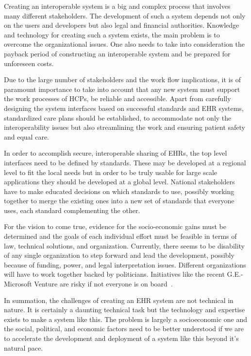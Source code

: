 \documentclass[14pt]{article}
\begin{document}
Creating an interoperable system is a big and complex process that involves many different stakeholders. The development of such a system depends not only on the users and developers but also legal and financial authorities. Knowledge and technology for creating such a system exists, the main problem is to overcome the organizational issues. One also needs to take into consideration the payback period of constructing an interoperable system and be prepared for unforeseen costs.

Due to the large number of stakeholders and the work flow implications, it is of paramount importance to take into account that any new system must support the work processes of \glspl{HCP}, be reliable and accessible. Apart from carefully designing the system interfaces based on successful standards and \gls{EHR} systems, standardized care plans should be established, to accommodate not only the interoperability issues but also streamlining the work and ensuring patient safety and equal care.


In order to accomplish secure, interoperable sharing of \glspl{EHR}, the \glspl{top level interface} need to be defined by standards. These may be developed at a regional level to fit the local needs but in order to be truly usable for large scale applications they should be developed at a global level. National stakeholders have to make educated decisions on which standards to use, possibly working together to merge the existing ones into a new set of standards that everyone uses, each standard complementing the other.

For the vision to come true, evidence for the socio-economic gains must be determined and the goals of each individual effort must be feasible in terms of law, technical solutions, and organization. Currently, there seems to be disability of any single organization to step forward and lead the development, possibly because of funding, power, and legal interpretation issues. Different organizations will have to work together backed by politicians. Initiatives like the recent G.E.-Microsoft Venture are risky if not everyone is on board~\cite{Bits}.

In summation, the challenges of creating an \gls{EHR} system are not technical in nature. It is certainly a daunting technical task but the technology and expertise exists to make a system like this. The problem is largely a socioeconomic one and the social, political, and economic factors need to be better understood if we are to accelerate the development and deployment of a system like this beyond it's natural pace.
\end{document}

